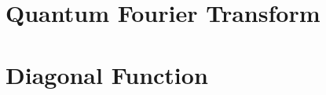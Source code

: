 \documentclass[
oneside,
11pt, a4paper,
footinclude=true,
headinclude=true,
cleardoublepage=empty
]{scrbook}
\begin{document}
\section{Quantum Fourier Transform}\label{sec:chapQFT}

\section{Diagonal Function}
%
\end{document}
